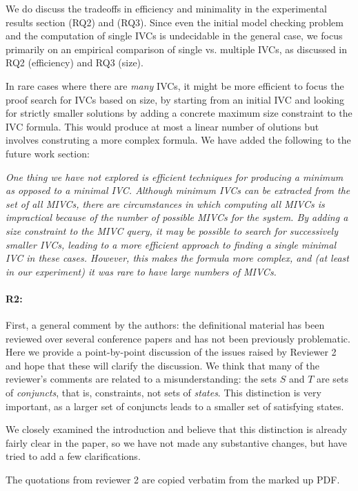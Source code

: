 \documentclass{article}
\begin{document}
We do discuss the tradeoffs in efficiency and minimality in the experimental results section (RQ2) and (RQ3).  Since even the initial model checking problem and the computation of single IVCs is undecidable in the general case, we focus primarily on an empirical comparison of single vs. multiple IVCs, as discussed in RQ2 (efficiency) and RQ3 (size).  

In rare cases where there are {\em many} IVCs, it might be more efficient to focus the proof search for IVCs based on size, by starting from an initial IVC and looking for strictly smaller solutions by adding a concrete maximum size constraint to the IVC formula.  This would produce at most a linear number of olutions but involves construting a more complex formula.  We have added the following to the future work section: 

\textit{
One thing we have not explored is efficient techniques for producing a {\em minimum} as opposed to a {\em minimal} IVC.  Although minimum IVCs can be extracted from the set of all MIVCs, there are circumstances in which computing all MIVCs is impractical because of the number of possible MIVCs for the system.  By adding a size constraint to the MIVC query, it may be possible to search for successively smaller IVCs, leading to a more efficient approach to finding a single minimal IVC in these cases.  However, this makes the formula more complex, and (at least in our experiment) it was rare to have large numbers of MIVCs.}


\paragraph{R2:} First, a general comment by the authors: the definitional material has been reviewed over several conference papers and has not been previously problematic. Here we provide a point-by-point discussion of the issues raised by Reviewer 2 and hope that these will clarify the discussion.  We think that many of the reviewer's comments are related to a misunderstanding: the sets $S$ and $T$ are sets of {\em conjuncts}, that is, constraints, not sets of {\em states}.  This distinction is very important, as a larger set of conjuncts leads to a smaller set of satisfying states.

We closely examined the introduction and believe that this distinction is already fairly clear in the paper, so we have not made any substantive changes, but have tried to add a few clarifications.

The quotations from reviewer 2 are copied verbatim from the marked up PDF.
\end{document}
